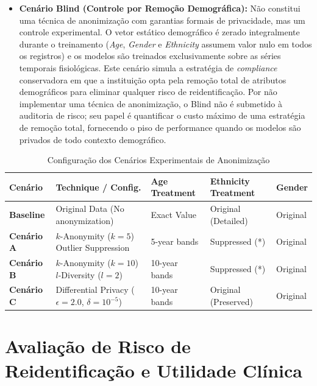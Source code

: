 \begin{itemize}
    \item \textbf{Cenário Blind (Controle por Remoção Demográfica):} Não constitui uma técnica de anonimização com garantias formais de privacidade, mas um controle experimental. O vetor estático demográfico é zerado integralmente durante o treinamento (\textit{Age}, \textit{Gender} e \textit{Ethnicity} assumem valor nulo em todos os registros) e os modelos são treinados exclusivamente sobre as séries temporais fisiológicas. Este cenário simula a estratégia de \textit{compliance} conservadora em que a instituição opta pela remoção total de atributos demográficos para eliminar qualquer risco de reidentificação. Por não implementar uma técnica de anonimização, o Blind não é submetido à auditoria de risco; seu papel é quantificar o custo máximo de uma estratégia de remoção total, fornecendo o piso de performance quando os modelos são privados de todo contexto demográfico.
\end{itemize}

\begin{table}[ht]
\centering
\caption{Configuração dos Cenários Experimentais de Anonimização}
\label{tab:cenarios-anonimizacao}
\small
\begin{tabular}{l|p{3cm}|p{2.5cm}|p{2.5cm}|p{2cm}}
\hline
\textbf{Cenário} & \textbf{Technique / Config.} & \textbf{Age Treatment} & \textbf{Ethnicity Treatment} & \textbf{Gender} \\ \hline
\textbf{Baseline} & Original Data (No anonymization) & Exact Value & Original (Detailed) & Original \\ \hline
\textbf{Cenário A} & $k$-Anonymity ($k=5$) \newline Outlier Suppression & 5-year bands & Suppressed (*) & Original \\ \hline
\textbf{Cenário B} & $k$-Anonymity ($k=10$) \newline $l$-Diversity ($l=2$) & 10-year bands & Suppressed (*) & Original \\ \hline
\textbf{Cenário C} & Differential Privacy \newline ($\epsilon=2.0$, $\delta=10^{-5}$) & 10-year bands & Original (Preserved) & Original \\ \hline
\end{tabular}
\end{table}

\section{Avaliação de Risco de Reidentificação e Utilidade Clínica}
\label{sec:metod-avaliacao}

